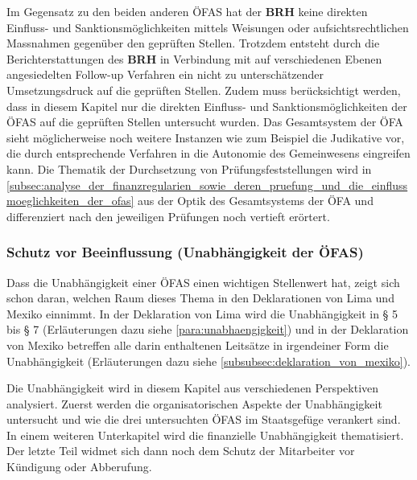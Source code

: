 \documentclass[10pt]{article}
\makeatletter
\renewcommand\paragraph{\@startsection{paragraph}{3}{0mm}{-\baselineskip}{.1\baselineskip}{\normalfont\normalsize\bfseries}}
\renewcommand\subparagraph{\@startsection{subparagraph}{4}{0mm}{-\baselineskip}{.1\baselineskip}{\normalfont\normalsize\bfseries}}
\renewcommand\paragraph{%
\@startsection{paragraph}{3}{0mm}%
{-\baselineskip}%
{.1\baselineskip}%
{\normalfont\normalsize\bfseries}}
\renewcommand\subparagraph{%
\@startsection{subparagraph}{4}{0mm}%
{-\baselineskip}%
{.1\baselineskip}%
{\normalfont\normalsize\bfseries}}
\makeatother
\begin{document}
Im Gegensatz zu den beiden anderen ÖFAS hat der \textbf{BRH} keine direkten Einfluss- und Sanktionsmöglichkeiten mittels Weisungen oder aufsichtsrechtlichen Massnahmen gegenüber den geprüften Stellen. Trotzdem entsteht durch die Berichterstattungen des \textbf{BRH} in Verbindung mit auf verschiedenen Ebenen angesiedelten Follow-up Verfahren ein nicht zu unterschätzender Umsetzungsdruck auf die geprüften Stellen. Zudem muss berücksichtigt werden, dass in diesem Kapitel nur die direkten Einfluss- und Sanktionsmöglichkeiten der ÖFAS auf die geprüften Stellen untersucht wurden. Das Gesamtsystem der ÖFA sieht möglicherweise noch weitere Instanzen wie zum Beispiel die Judikative vor, die durch entsprechende Verfahren in die Autonomie des Gemeinwesens eingreifen kann. Die Thematik der Durchsetzung von Prüfungs­fest­stellungen wird in \vref{subsec:analyse_der_finanzregularien_sowie_deren_pruefung_und_die_einflussmoeglichkeiten_der_ofas} aus der Optik des Gesamt­systems der ÖFA und differenziert nach den jeweiligen Prüfungen noch vertieft erörtert.

\makeatletter
\renewcommand\subparagraph{%
\@startsection{subparagraph}{4}{0mm}%
{-\baselineskip}%
{.1\baselineskip}%
{\normalfont\normalsize\bfseries}}
\makeatother
\subsubsection{Schutz vor Beeinflussung (Unabhängigkeit der ÖFAS)}\label{subsubsec:schutz_vor_beeinflussung__unabhaengigkeit_der_ofas_}
Dass die Unabhängigkeit einer ÖFAS einen wichtigen Stellenwert hat, zeigt sich schon daran, welchen Raum dieses Thema in den Deklarationen von Lima und Mexiko einnimmt. In der Deklaration von Lima wird die Unabhängigkeit in § 5 bis § 7 (Erläuterungen dazu siehe \vref{para:unabhaengigkeit}) und in der Deklaration von Mexiko betreffen alle darin enthaltenen Leitsätze in irgendeiner Form die Unabhängigkeit (Erläuterungen dazu siehe \vref{subsubsec:deklaration_von_mexiko}).

Die Unabhängigkeit wird in diesem Kapitel aus verschiedenen Perspektiven analysiert. Zuerst werden die organisatorischen Aspekte der Unabhängigkeit untersucht und wie die drei untersuchten ÖFAS im Staatsgefüge verankert sind. In einem weiteren Unterkapitel wird die finanzielle Unabhängigkeit thematisiert. Der letzte Teil widmet sich dann noch dem Schutz der Mitarbeiter vor Kündigung oder Abberufung.

\makeatletter
\renewcommand\paragraph{%
\@startsection{paragraph}{3}{0mm}%
{-\baselineskip}%
{.5\baselineskip}%
{\normalfont\normalsize\bfseries}}
\makeatother
\end{document}
